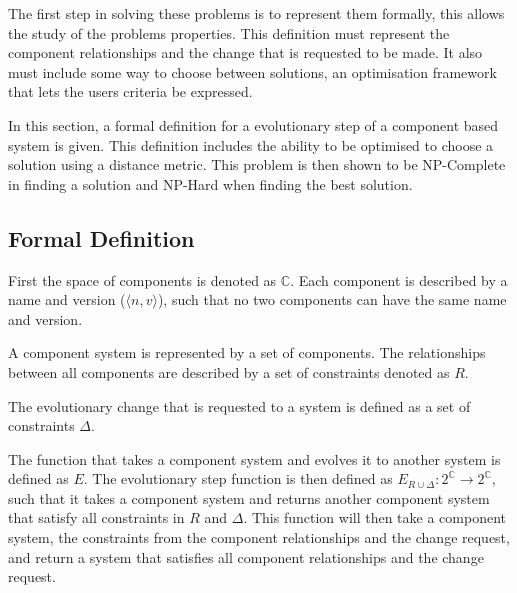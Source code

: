 The first step in solving these problems is to represent them formally, this allows the study of the problems properties.
This definition must represent the component relationships and the change that is requested to be made. 
It also must include some way to choose between solutions, an optimisation framework that lets the users criteria be expressed.

In this section, a formal definition for a evolutionary step of a component based system is given.
This definition includes the ability to be optimised to choose a solution using a distance metric.
This problem is then shown to be NP-Complete in finding a solution and NP-Hard when finding the best solution.

\subsection{Formal Definition}
First the space of components is denoted as $\mathbb{C}$.
Each component is described by a name and version ($\langle n, v\rangle$), such that no two components can have the same name and version.

A component system is represented by a set of components.
The relationships between all components are described by a set of constraints denoted as $R$.

The evolutionary change that is requested to a system is defined as a set of constraints $\Delta$.

The function that takes a component system and evolves it to another system is defined as $E$.
The evolutionary step function is then defined as $E_{R \cup \Delta}: 2^\mathbb{C} \rightarrow 2^\mathbb{C}$, 
such that it takes a component system and returns another component system that satisfy all constraints in $R$ and $\Delta$.
This function will then take a component system, the constraints from the component relationships and the change request,
and return a system that satisfies all component relationships and the change request.

